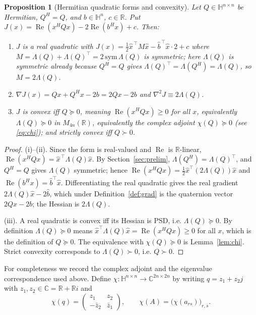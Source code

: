 \documentclass{amsart}
\newtheorem{proposition}[theorem]{Proposition}
\theoremstyle{definition}
\newcommand{\HH}{\mathbb{H}}
\newcommand{\RR}{\mathbb{R}}
\newcommand{\CC}{\mathbb{C}}
\newcommand{\Real}{\operatorname{Re}}
\begin{document}
\begin{proposition}[Hermitian quadratic forms and convexity]
\label{prop:hermconvex}
Let $Q\in\HH^{n\times n}$ be \emph{Hermitian}, $Q^{H}=Q$, and
$b\in\HH^n$, $c\in\RR$. Put
$J(x)=\Real(x^{H}Qx)-2\Real(b^{H}x)+c$. Then:
\begin{enumerate}
\item[\textup{(i)}] $J$ is a real quadratic with
$J(x)=\tfrac12\widehat x^{\,\top}M\widehat x-\widehat b^{\,\top}\widehat
x\cdot2+c$ where
$M=\Lambda(Q)+\Lambda(Q)^{\!\top}=2\,\mathrm{sym}\,\Lambda(Q)$ is
symmetric; here $\Lambda(Q)$ is symmetric already because $Q^H=Q$ gives
$\Lambda(Q)^{\!\top}=\Lambda(Q^H)=\Lambda(Q)$, so $M=2\Lambda(Q)$.
\item[\textup{(ii)}] $\nabla J(x)=Qx+Q^Hx-2b=2Qx-2b$ and
$\nabla^2J\equiv 2\Lambda(Q)$.
\item[\textup{(iii)}] $J$ is convex iff $Q\succeq0$, meaning
$\Real(x^HQx)\ge0$ for all $x$, equivalently $\Lambda(Q)\succeq0$ in
$M_{4n}(\RR)$, equivalently the complex adjoint $\chi(Q)\succeq0$
\textup{(}see \eqref{eq:chi}\textup{)}; and strictly convex iff
$Q\succ0$.
\end{enumerate}
\end{proposition}

\begin{proof}
(i)–(ii). Since the form is real-valued and $\Real$ is $\RR$-linear,
$\Real(x^HQx)=\widehat x^{\,\top}\Lambda(Q)\widehat x$. By
Section~\ref{sec:prelim}, $\Lambda(Q^H)=\Lambda(Q)^{\!\top}$, and
$Q^H=Q$ gives $\Lambda(Q)$ symmetric; hence
$\Real(x^HQx)=\tfrac12\widehat x^{\top}(2\Lambda(Q))\widehat x$ and
$\Real(b^Hx)=\widehat b^{\top}\widehat x$. Differentiating the real
quadratic gives the real gradient $2\Lambda(Q)\widehat x-2\widehat b$,
which under Definition~\ref{def:grad} is the quaternion vector
$2Qx-2b$; the Hessian is $2\Lambda(Q)$.

(iii). A real quadratic is convex iff its Hessian is PSD, i.e.
$\Lambda(Q)\succeq0$. By definition $\Lambda(Q)\succeq0$ means
$\widehat x^{\top}\Lambda(Q)\widehat x=\Real(x^HQx)\ge0$ for all $x$,
which is the definition of $Q\succeq0$. The equivalence with
$\chi(Q)\succeq0$ is Lemma~\ref{lem:chi}. Strict convexity corresponds
to $\Lambda(Q)\succ0$, i.e. $Q\succ0$.
\end{proof}

For completeness we record the complex adjoint and the eigenvalue
correspondence used above. Define
$\chi\colon\HH^{n\times n}\to\CC^{2n\times2n}$ by writing
$q=z_1+z_2 j$ with $z_1,z_2\in\CC=\RR+\RR i$ and
\begin{equation}\label{eq:chi}
\chi(q)=\begin{pmatrix} z_1 & z_2\\ -\bar z_2 & \bar z_1\end{pmatrix},
\qquad \chi(A)=\bigl(\chi(a_{rs})\bigr)_{r,s}.
\end{equation}
\end{document}
